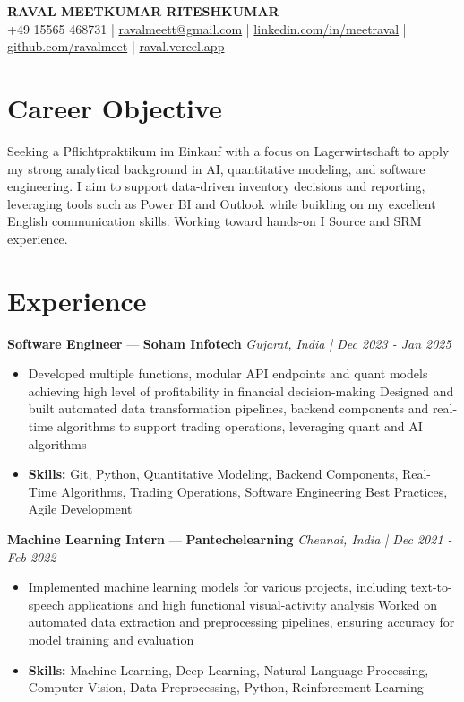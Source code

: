 \documentclass[a4paper,10pt]{article}
\begin{document}
\begin{center}
  {\Large\bfseries RAVAL MEETKUMAR RITESHKUMAR}\\[2pt]
  {\small +49 15565 468731 \;|\; \href{mailto:ravalmeett@gmail.com}{ravalmeett@gmail.com} \;|\; \href{https://www.linkedin.com/in/meetraval/}{linkedin.com/in/meetraval} \;|\; \href{https://github.com/ravalmeet}{github.com/ravalmeet} \;|\; \href{https://raval.vercel.app/}{raval.vercel.app}}
\end{center}
\vspace{-3pt}

\section*{Career Objective}
Seeking a Pflichtpraktikum im Einkauf with a focus on Lagerwirtschaft to apply my strong analytical background in AI, quantitative modeling, and software engineering. I aim to support data-driven inventory decisions and reporting, leveraging tools such as Power BI and Outlook while building on my excellent English communication skills. Working toward hands-on I Source and SRM experience.\par

\section*{Experience}
\textbf{Software Engineer} — \textbf{Soham Infotech} \hfill \textit{Gujarat, India \;|\; Dec 2023 - Jan 2025}\par
\vspace{1pt}
\begin{itemize}
  \item Developed multiple functions, modular API endpoints and quant models achieving high level of profitability in financial decision-making Designed and built automated data transformation pipelines, backend components and real-time algorithms to support trading operations, leveraging quant and AI algorithms
  \item \textbf{Skills:} Git, Python, Quantitative Modeling, Backend Components, Real-Time Algorithms, Trading Operations, Software Engineering Best Practices, Agile Development
\end{itemize}
\vspace{3pt}
\textbf{Machine Learning Intern} — \textbf{Pantechelearning} \hfill \textit{Chennai, India \;|\; Dec 2021 - Feb 2022}\par
\vspace{1pt}
\begin{itemize}
  \item Implemented machine learning models for various projects, including text-to-speech applications and high functional visual-activity analysis Worked on automated data extraction and preprocessing pipelines, ensuring accuracy for model training and evaluation
  \item \textbf{Skills:} Machine Learning, Deep Learning, Natural Language Processing, Computer Vision, Data Preprocessing, Python, Reinforcement Learning
\end{itemize}
\end{document}
